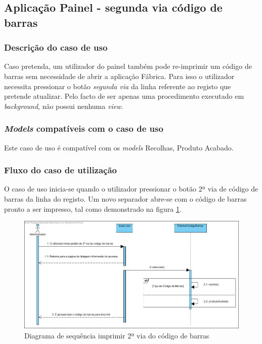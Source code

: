 \subsection{Aplicação Painel - segunda via código de barras}
\subsubsection*{Descrição do caso de uso}
Caso pretenda, um utilizador do painel também pode re-imprimir um código de barras sem necessidade de abrir a aplicação Fábrica. Para isso o utilizador necessita pressionar o botão\textit{ segunda via} da linha referente ao registo que pretende atualizar. Pelo facto de ser apenas uma procedimento executado em \textit{background}, não possui nenhuma \textit{view}.

\subsubsection*{\textit{Models} compatíveis com o caso de uso}
Este caso de uso é compatível com os \textit{models} Recolhas, Produto Acabado.

\subsubsection*{Fluxo do caso de utilização}
O caso de uso inicia-se quando o utilizador pressionar o botão 2ª via de código de barras da linha do registo. Um novo separador abre-se com o código de barras pronto a ser impresso, tal como demonstrado na figura \ref{fig:sd_2_via_painel}.


\begin{figure}[H] 
	\begin{center}
		\includegraphics[width=\textwidth,keepaspectratio]{figuras/Diagramas_vp/SD_Painel_6_2_via_Codigo_de_Barras.jpg}
		\caption{Diagrama de sequência imprimir 2ª via do código de barras}
		\label{fig:sd_2_via_painel} 
	\end{center}
\end{figure}
